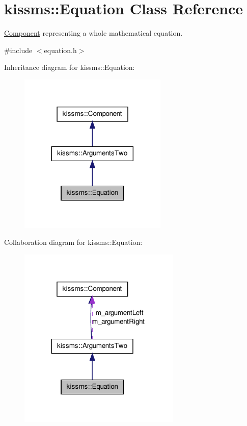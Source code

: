 \hypertarget{classkissms_1_1_equation}{\section{kissms\-:\-:Equation Class Reference}
\label{classkissms_1_1_equation}
}


\hyperlink{classkissms_1_1_component}{Component} representing a whole mathematical equation.  




{\ttfamily \#include $<$equation.\-h$>$}



Inheritance diagram for kissms\-:\-:Equation\-:
\nopagebreak
\begin{figure}[H]
\begin{center}
\leavevmode
\includegraphics[width=200pt]{classkissms_1_1_equation__inherit__graph}
\end{center}
\end{figure}


Collaboration diagram for kissms\-:\-:Equation\-:
\nopagebreak
\begin{figure}[H]
\begin{center}
\leavevmode
\includegraphics[width=218pt]{classkissms_1_1_equation__coll__graph}
\end{center}
\end{figure}
